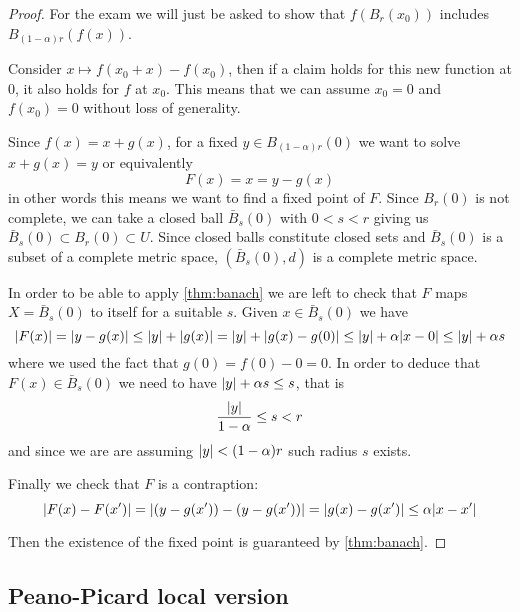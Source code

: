 \documentclass[12pt]{extarticle}
\begin{document}
\begin{proof}
	For the exam we will just be asked to show that $f(B_r(x_0))$ includes $B_{(1-\alpha)r}(f(x))$.

	Consider $x \mapsto f(x_0 + x) - f(x_0)$, then if a claim holds for this new function at $0$, it also holds for $f$ at $x_0$.
	This means that we can assume $x_0 = 0$ and $f(x_0) =0$ without loss of generality.

	Since $f(x) = x + g(x)$, for a fixed $y \in B_{(1-\alpha)r}(0)$ we want to solve $x + g(x) = y$ or equivalently
	\begin{equation}
		F(x) = x = y-g(x)
	\end{equation}
	in other words this means we want to find a fixed point of $F$.
	Since $B_r(0)$ is not complete, we can take a closed ball $\bar B_s(0)$ with $0 < s< r$ giving us
	$\bar B_s(0) \subset B_r(0) \subset U$.
	Since closed balls constitute closed sets and $\bar B_s(0)$ is a subset of a complete metric space,
	$(\bar B_s(0), d)$ is a complete metric space.

	In order to be able to apply \cref{thm:banach} we are left to check that $F$ maps $X = \bar B_s(0)$ to itself
	for a suitable $s$.
	Given $x \in \bar B_s(0)$ we have
	\begin{equation}
		\abs{F(x)} = \abs{y - g(x)} \leq \abs{y} + \abs{g(x)} =  \abs{y} + \abs{g(x) - g(0)} \leq \abs{y} + \alpha \abs{x - 0} \leq \abs{y} + \alpha s
	\end{equation}
	where we used the fact that $g(0) = f(0) - 0 = 0$.
	In order to deduce that $F(x) \in \bar B_s (0)$ we need to have $\abs{y} + \alpha s \leq s$, that is
	\begin{equation}
		\frac{\abs{y}}{1-\alpha} \leq s < r
	\end{equation}
	and since we are are assuming $\abs{y} < (1-\alpha) r$ such radius $s$ exists.

	Finally we check that $F$ is a contraption:
	\begin{equation}
		\abs{F(x) - F(x')} = \abs{(y-g(x')) - (y-g(x'))} = \abs{g(x)-g(x')} \leq \alpha \abs{x-x'}
	\end{equation}

	Then the existence of the fixed point is guaranteed by \cref{thm:banach}.
\end{proof}

\subsection{Peano-Picard local version}
\end{document}
